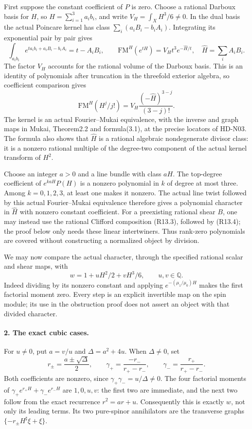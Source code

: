 First suppose the constant coefficient of \(P\) is zero.
Choose a rational Darboux basis for \(H\), so
\(H=\sum_{i=1}^3 a_i b_i\), and write
\(V_H=\int_X H^3/6\ne0\). In the dual basis the actual
Poincare kernel has class
\(\sum_i(a_i B_i-b_i A_i)\). Integrating its exponential
pair by pair gives
\[
 \int_{a_i b_i}e^{t a_i b_i+a_i B_i-b_i A_i}
             =t-A_iB_i,
 \qquad
 \mathrm{FM}^H(e^{tH})=V_H t^3e^{-\widehat H/t},
 \quad\widehat H=\sum_iA_iB_i.                            \tag{R13.4}
\]
The factor \(V_H\) accounts for the rational volume of the
Darboux basis. This is an identity of polynomials after truncation
in the threefold exterior algebra, so coefficient comparison gives
\[
 \mathrm{FM}^H(H^j/j!)
       =V_H\frac{(-\widehat H)^{3-j}}{(3-j)!}.
                                                               \tag{R13.5}
\]
The kernel is an actual Fourier--Mukai equivalence, with the
inverse and graph maps in Mukai, Theorem2.2 and formula(3.1),
at the precise locators of HD-N03. The formula also shows that
\(\widehat H\) is a rational algebraic nondegenerate divisor
class: it is a nonzero rational multiple of the degree-two
component of the actual kernel transform of \(H^2\).

Choose an integer \(a>0\) and a line bundle with class \(aH\).
The top-degree coefficient of \(e^{kaH}P(H)\) is a nonzero
polynomial in \(k\) of degree at most three. Among
\(k=0,1,2,3\), at least one makes it nonzero. The actual
line twist followed by this actual Fourier--Mukai equivalence
therefore gives a polynomial character in \(\widehat H\)
with nonzero constant coefficient. For a preexisting rational
shear \(B\), one may instead use the rational Clifford
composition (R13.3), followed by (R13.4); the proof below only
needs these linear intertwiners. Thus rank-zero polynomials are
covered without constructing a normalized object by division.

We may now compare the actual character, through the specified
rational scalar and shear maps, with
\[
                    w=1+uH^2/2+vH^3/6,
                        \qquad u,v\in\mathbb Q.             \tag{R13.6}
\]
Indeed dividing by its nonzero constant and applying
\(e^{-(\mu_1/\mu_0)H}\) makes the first factorial moment
zero. Every step is an explicit invertible map on the spin
module; its use in the obstruction proof does not assert an
object with that divided character.

\paragraph{2. The exact cubic cases.}
For \(u\ne0\), put \(a=v/u\) and
\(\Delta=a^2+4u\). When \(\Delta\ne0\), set
\[
 r_\pm=\frac{a\pm\sqrt\Delta}{2},\qquad
 \gamma_+=\frac{-r_-}{r_+-r_-},\qquad
 \gamma_-=\frac{r_+}{r_+-r_-}.
                                                               \tag{R13.7}
\]
Both coefficients are nonzero, since
\(\gamma_+\gamma_-=u/\Delta\ne0\). The four factorial
moments of
\(\gamma_+e^{r_+H}+\gamma_-e^{r_-H}\) are
\(1,0,u,v\): the first two are immediate, and the next
two follow from the exact recurrence \(r^2=ar+u\).
Consequently this is exactly \(w\), not only its leading
terms. Its two pure-spinor annihilators are the transverse
graphs \(\{-r_\pm H^\sharp\xi+\xi\}\).

